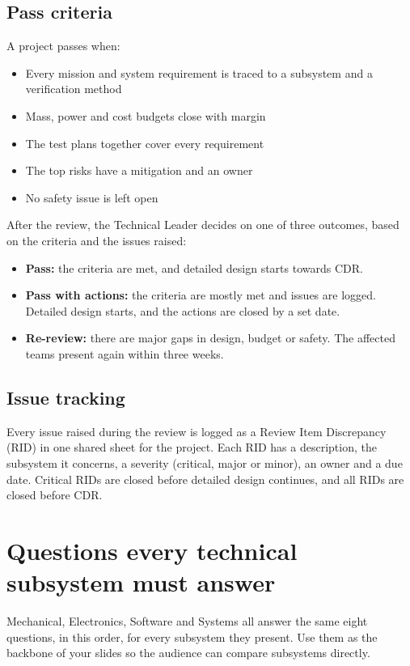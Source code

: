 \documentclass{../../Common/Latex/Templates/rapport}
\renewcommand{\vsection}[1]{\section{#1}}
\renewcommand{\vsubsection}[1]{\subsection{#1}}
\begin{document}
\vsubsection{Pass criteria}
A project passes when:
\begin{itemize}
  \item Every mission and system requirement is traced to a subsystem and a verification method
  \item Mass, power and cost budgets close with margin
  \item The test plans together cover every requirement
  \item The top risks have a mitigation and an owner
  \item No safety issue is left open
\end{itemize}

After the review, the Technical Leader decides on one of three outcomes, based on the criteria and the issues raised:
\begin{itemize}
  \item \textbf{Pass:} the criteria are met, and detailed design starts towards CDR.
  \item \textbf{Pass with actions:} the criteria are mostly met and issues are logged. Detailed design starts, and the actions are closed by a set date.
  \item \textbf{Re-review:} there are major gaps in design, budget or safety. The affected teams present again within three weeks.
\end{itemize}

\vsubsection{Issue tracking}
Every issue raised during the review is logged as a Review Item Discrepancy (RID) in one shared sheet for the project. Each RID has a description, the subsystem it concerns, a severity (critical, major or minor), an owner and a due date. Critical RIDs are closed before detailed design continues, and all RIDs are closed before CDR.

\vsection{Questions every technical subsystem must answer}
Mechanical, Electronics, Software and Systems all answer the same eight questions, in this order, for every subsystem they present. Use them as the backbone of your slides so the audience can compare subsystems directly.
\end{document}
